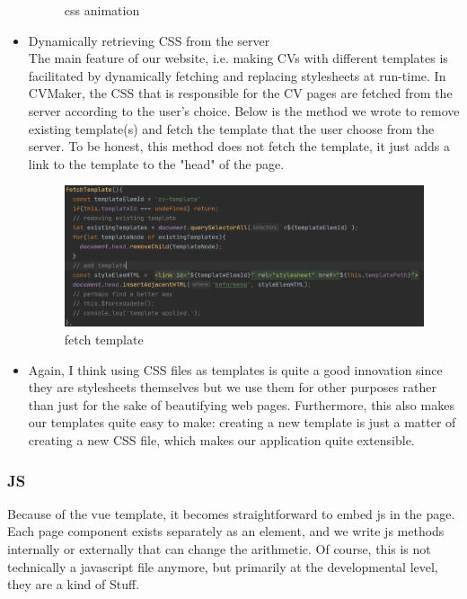 \documentclass[11pt]{article}
\begin{document}
\begin{spacing}{1.0}
\begin{itemize}
\begin{figure}[H]
 	\caption{css animation}
 	\label{fig:11}
 \end{figure}
\item Dynamically retrieving CSS from the server\\
The main feature of our website, i.e. making CVs with different templates is facilitated by dynamically fetching and replacing stylesheets at run-time.  
In CVMaker, the CSS that is responsible for the CV pages are fetched from the server according to the user's choice. Below is the method we wrote to remove existing template(s) and fetch the template that the user choose from the server. To be honest, this method does not fetch the template, it just adds a link to the template to the "head" of the page. 
 \begin{figure}[H]
	\centering
	\includegraphics[scale=.4]{figures/cssTemplate.png}
	\caption{fetch template}
	\label{fig:12}
\end{figure}

	\item
	Again, I think using CSS files as templates is quite a good innovation since they are stylesheets themselves but we use them for other purposes rather than just for the sake of beautifying web pages. Furthermore, this also makes our templates quite easy to make: creating a new template is just a matter of creating a new CSS file, which makes our application quite extensible.
		
		
	\end{itemize}
	\subsubsection{JS}Because of the vue template, it becomes straightforward to embed js in the page. Each page component exists separately as an element, and we write js methods internally or externally that can change the arithmetic. Of course, this is not technically a javascript file anymore, but primarily at the developmental level, they are a kind of Stuff.
	

\end{spacing}
\end{document}
